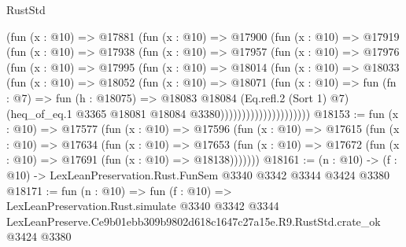 \begin{lexlean}{RustStd}
\begin{coremodule}
                    (fun (x : @10) =>
                    @17881
                      (fun (x : @10) =>
                      @17900
                        (fun (x : @10) =>
                        @17919
                          (fun (x : @10) =>
                          @17938
                            (fun (x : @10) =>
                            @17957
                              (fun (x : @10) =>
                              @17976
                                (fun (x : @10) =>
                                @17995
                                  (fun (x : @10) =>
                                  @18014
                                    (fun (x : @10) =>
                                    @18033
                                      (fun (x : @10) =>
                                      @18052
                                        (fun (x : @10) =>
                                        @18071
                                          (fun (x : @10) =>
                                          fun (fn : @7) =>
                                          fun (h : @18075) =>
                                          @18083
                                            @18084
                                            (Eq.refl.{2} (Sort 1) @7)
                                            (heq_of_eq.{1}
                                              @3365
                                              @18081
                                              @18084
                                              @3380)))))))))))))))))))))
@18153 := fun (x : @10) =>
  @17577
    (fun (x : @10) =>
    @17596
      (fun (x : @10) =>
      @17615
        (fun (x : @10) =>
        @17634
          (fun (x : @10) =>
          @17653 (fun (x : @10) => @17672 (fun (x : @10) => @17691 (fun (x : @10) => @18138)))))))
@18161 := (n : @10) -> (f : @10) -> LexLeanPreservation.Rust.FunSem @3340 @3342 @3344 @3424 @3380
@18171 := fun (n : @10) =>
  fun (f : @10) =>
  LexLeanPreservation.Rust.simulate
    @3340
    @3342
    @3344
    LexLeanPreserve.Ce9b01ebb309b9802d618c1647c27a15e.R9.RustStd.crate_ok
    @3424
    @3380
\end{coremodule}
\end{lexlean}
